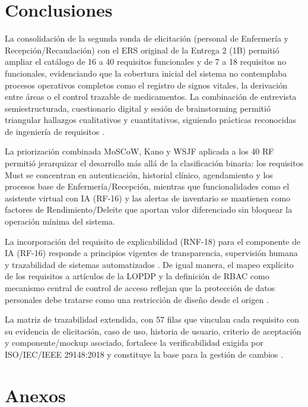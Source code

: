 \documentclass[11pt,a4paper]{article}
\begin{document}
	
	\section{Conclusiones}
	
	La consolidación de la segunda ronda de elicitación (personal de Enfermería y Recepción/Recaudación) con el ERS original de la Entrega 2 (1B) permitió ampliar el catálogo de 16 a 40 requisitos funcionales y de 7 a 18 requisitos no funcionales, evidenciando que la cobertura inicial del sistema no contemplaba procesos operativos completos como el registro de signos vitales, la derivación entre áreas o el control trazable de medicamentos. La combinación de entrevista semiestructurada, cuestionario digital y sesión de brainstorming permitió triangular hallazgos cualitativos y cuantitativos, siguiendo prácticas reconocidas de ingeniería de requisitos \cite{iso29148,nuseibeh2000,pohl2010}.
	
	La priorización combinada MoSCoW, Kano y WSJF aplicada a los 40 RF permitió jerarquizar el desarrollo más allá de la clasificación binaria: los requisitos Must se concentran en autenticación, historial clínico, agendamiento y los procesos base de Enfermería/Recepción, mientras que funcionalidades como el asistente virtual con IA (RF-16) y las alertas de inventario se mantienen como factores de Rendimiento/Deleite que aportan valor diferenciado sin bloquear la operación mínima del sistema.
	
	La incorporación del requisito de explicabilidad (RNF-18) para el componente de IA (RF-16) responde a principios vigentes de transparencia, supervisión humana y trazabilidad de sistemas automatizados \cite{whoai2021,euaiact2024,fda2022}. De igual manera, el mapeo explícito de los requisitos a artículos de la LOPDP y la definición de RBAC como mecanismo central de control de acceso reflejan que la protección de datos personales debe tratarse como una restricción de diseño desde el origen \cite{loppd,iso27799,sandhu2000}.
	
	La matriz de trazabilidad extendida, con 57 filas que vinculan cada requisito con su evidencia de elicitación, caso de uso, historia de usuario, criterio de aceptación y componente/mockup asociado, fortalece la verificabilidad exigida por ISO/IEC/IEEE 29148:2018 y constituye la base para la gestión de cambios \cite{iso29148,gotel1994,ramesh2001,clelandhuang2003}.
	
	

	
	\section{Anexos}
	
\end{document}
